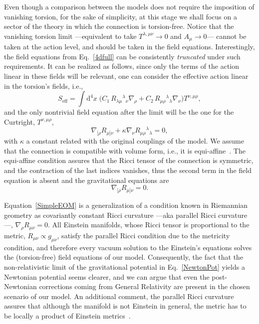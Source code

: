 \documentclass[aps,prd,12pt,twocolumn,superscriptaddress,showpacs,showkeys,reprint,longbibliography]{revtex4-1}
\newcommand\nab[1]{\nabla_{{#1}}}
\renewcommand{\(}{\left(}
\renewcommand{\)}{\right)}
\renewcommand{\[}{\left[}
\renewcommand{\]}{\right]}
\newcommand{\dn}[2]{{\mathrm{d}}^{#1}{#2}\;}
\newcommand{\hl}[1]{{\color{red} \bfseries{#1}}}
\begin{document}
Even though a comparison between the models does not require the imposition of vanishing torsion, for the sake of simplicity, at this stage we shall focus on a sector of the theory in which the connection is torsion-free. Notice that the vanishing torsion limit ---equivalent to take $T^{\lambda,\mu\nu} \to 0$ and $A_\mu \to 0$--- cannot be taken at the action level, and should be taken in the field equations. Interestingly, the field equations from Eq.~\eqref{4dfull} can be consistently \emph{truncated} under such requirements. It can be realized as follows, since only the terms of the action linear in these fields will be relevant, one can consider the effective action linear in the torsion's fields, i.e.,
\begin{equation}
  S_{\text{eff}} = \int\dn{4}{x} \Big( C_1\, R_{\lambda\mu}{}^{\lambda}{}_\nu \nabla_\rho %
  + C_2 \, R_{\mu\rho}{}^{\lambda}{}_\lambda \nabla_\nu \Big) T^{\nu,\mu\rho} ,
\end{equation}
and the only nontrivial field equation after the limit will be the one for the Curtright, $T^{\nu,\mu\rho}$,
\begin{equation}
  \nab{[\rho} R_{\mu]\nu} + \kappa \nab{\nu} R_{\mu\rho}{}^\lambda{}_\lambda = 0,
\end{equation}
with $\kappa$ a constant related with the original couplings of the model. We assume that the connection is compatible with volume form, i.e., it is equi-affine~\cite{nomizu1994affine,MO-Bryant02}.  The equi-affine condition assures that the Ricci tensor of the connection is symmetric, and the contraction of the last indices vanishes, thus the second term in the field equation is absent and the gravitational equations are
\begin{equation}
  \nab{[\rho} R_{\mu]\nu} = 0.
  \label{SimpleEOM}
\end{equation}

Equation~\eqref{SimpleEOM} is a generalization of a condition known in Riemannian geometry as covariantly constant Ricci curvature ---aka parallel Ricci curvature---, \mbox{$\nab{\rho} R_{\mu\nu} = 0$.}  All Einstein manifolds, whose Ricci tensor is proportional to the metric, \mbox{$R_{\mu\nu} \propto g_{\mu\nu}$,} satisfy the parallel Ricci condition due to the metricity condition, and therefore every vacuum solution to the Einstein's equations solves the (torsion-free) field equations of our model. Consequently, the fact that the non-relativistic limit of the gravitational potential in Eq.~\eqref{NewtonPot} yields a Newtonian potential seems clearer, and we can argue that even the post-Newtonian corrections coming from General Relativity are present in the chosen scenario of our model. An additional comment, the parallel Ricci curvature assures that although the manifold is not Einstein in general, the metric has to be locally a product of Einstein metrics~\cite{Besse}.
\end{document}
